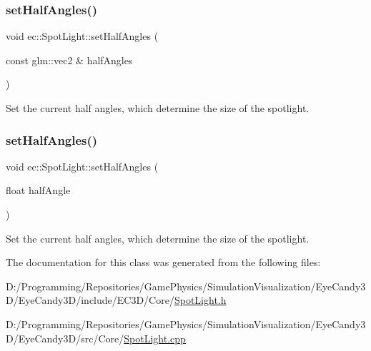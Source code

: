 \subsubsection{\texorpdfstring{set\+Half\+Angles()}{setHalfAngles()}\hspace{0.1cm}{\footnotesize\ttfamily [1/2]}}
{\footnotesize\ttfamily void ec\+::\+Spot\+Light\+::set\+Half\+Angles (\begin{DoxyParamCaption}\item[{const glm\+::vec2 \&}]{half\+Angles }\end{DoxyParamCaption})}



Set the current half angles, which determine the size of the spotlight. 

\mbox{\label{classec_1_1_spot_light_a0b9a13abe376b5e0513f243036b41af9}} 
\subsubsection{\texorpdfstring{set\+Half\+Angles()}{setHalfAngles()}\hspace{0.1cm}{\footnotesize\ttfamily [2/2]}}
{\footnotesize\ttfamily void ec\+::\+Spot\+Light\+::set\+Half\+Angles (\begin{DoxyParamCaption}\item[{float}]{half\+Angle }\end{DoxyParamCaption})}



Set the current half angles, which determine the size of the spotlight. 



The documentation for this class was generated from the following files\+:\begin{DoxyCompactItemize}
\item 
D\+:/\+Programming/\+Repositories/\+Game\+Physics/\+Simulation\+Visualization/\+Eye\+Candy3\+D/\+Eye\+Candy3\+D/include/\+E\+C3\+D/\+Core/\mbox{\hyperlink{_spot_light_8h}{Spot\+Light.\+h}}\item 
D\+:/\+Programming/\+Repositories/\+Game\+Physics/\+Simulation\+Visualization/\+Eye\+Candy3\+D/\+Eye\+Candy3\+D/src/\+Core/\mbox{\hyperlink{_spot_light_8cpp}{Spot\+Light.\+cpp}}\end{DoxyCompactItemize}
